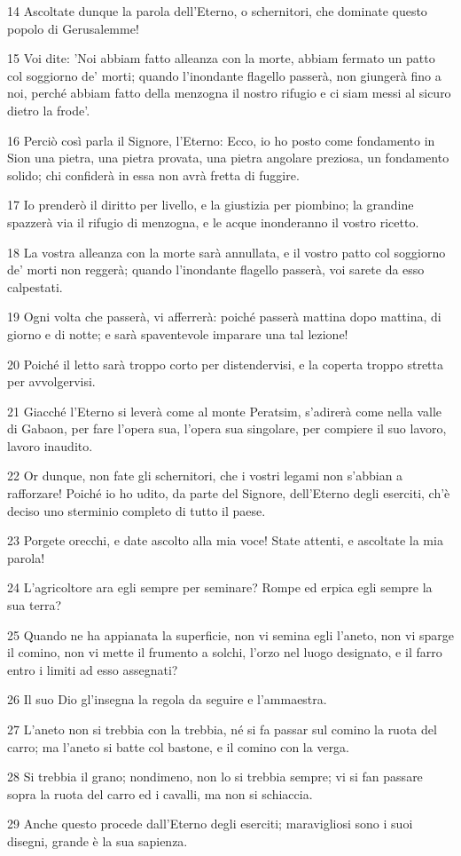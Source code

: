 \par 14 Ascoltate dunque la parola dell'Eterno, o schernitori, che dominate questo popolo di Gerusalemme!
\par 15 Voi dite: 'Noi abbiam fatto alleanza con la morte, abbiam fermato un patto col soggiorno de' morti; quando l'inondante flagello passerà, non giungerà fino a noi, perché abbiam fatto della menzogna il nostro rifugio e ci siam messi al sicuro dietro la frode'.
\par 16 Perciò così parla il Signore, l'Eterno: Ecco, io ho posto come fondamento in Sion una pietra, una pietra provata, una pietra angolare preziosa, un fondamento solido; chi confiderà in essa non avrà fretta di fuggire.
\par 17 Io prenderò il diritto per livello, e la giustizia per piombino; la grandine spazzerà via il rifugio di menzogna, e le acque inonderanno il vostro ricetto.
\par 18 La vostra alleanza con la morte sarà annullata, e il vostro patto col soggiorno de' morti non reggerà; quando l'inondante flagello passerà, voi sarete da esso calpestati.
\par 19 Ogni volta che passerà, vi afferrerà: poiché passerà mattina dopo mattina, di giorno e di notte; e sarà spaventevole imparare una tal lezione!
\par 20 Poiché il letto sarà troppo corto per distendervisi, e la coperta troppo stretta per avvolgervisi.
\par 21 Giacché l'Eterno si leverà come al monte Peratsim, s'adirerà come nella valle di Gabaon, per fare l'opera sua, l'opera sua singolare, per compiere il suo lavoro, lavoro inaudito.
\par 22 Or dunque, non fate gli schernitori, che i vostri legami non s'abbian a rafforzare! Poiché io ho udito, da parte del Signore, dell'Eterno degli eserciti, ch'è deciso uno sterminio completo di tutto il paese.
\par 23 Porgete orecchi, e date ascolto alla mia voce! State attenti, e ascoltate la mia parola!
\par 24 L'agricoltore ara egli sempre per seminare? Rompe ed erpica egli sempre la sua terra?
\par 25 Quando ne ha appianata la superficie, non vi semina egli l'aneto, non vi sparge il comino, non vi mette il frumento a solchi, l'orzo nel luogo designato, e il farro entro i limiti ad esso assegnati?
\par 26 Il suo Dio gl'insegna la regola da seguire e l'ammaestra.
\par 27 L'aneto non si trebbia con la trebbia, né si fa passar sul comino la ruota del carro; ma l'aneto si batte col bastone, e il comino con la verga.
\par 28 Si trebbia il grano; nondimeno, non lo si trebbia sempre; vi si fan passare sopra la ruota del carro ed i cavalli, ma non si schiaccia.
\par 29 Anche questo procede dall'Eterno degli eserciti; maravigliosi sono i suoi disegni, grande è la sua sapienza.

